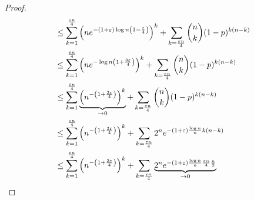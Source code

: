 \begin{proof}
\begin{align*}
		&\leq \sum_{k=1}^{\frac{\varepsilon n}{4}} \qty(ne^{-(1+\varepsilon) \log n \qty(1 - \frac{\varepsilon}{4})})^k + \sum_{k=\frac{\varepsilon n}{4}} \binom n k (1-p)^{k (n - k)} \\
		&\leq \sum_{k=1}^{\frac{\varepsilon n}{4}} \qty(ne^{-\log n\qty(1+\frac{3\varepsilon}{4})})^k + \sum_{k=\frac{\varepsilon n}{4}} \binom n k (1-p)^{k (n - k)} \\
		&\leq \sum_{k=1}^{\frac{\varepsilon n}{4}} \underbrace{\qty(n^{-\qty(1+\frac{3\varepsilon}{4})})^k}_{\to 0} + \sum_{k=\frac{\varepsilon n}{4}} \binom n k (1-p)^{k (n - k)} \\
		&\leq \sum_{k=1}^{\frac{\varepsilon n}{4}} \qty(n^{-\qty(1+\frac{3\varepsilon}{4})})^k + \sum_{k=\frac{\varepsilon n}{4}} 2^n e^{-(1 + \varepsilon) \frac{\log n}{n} k(n-k)} \\
		&\leq \sum_{k=1}^{\frac{\varepsilon n}{4}} \qty(n^{-\qty(1+\frac{3\varepsilon}{4})})^k + \sum_{k=\frac{\varepsilon n}{4}} \underbrace{2^n e^{-(1 + \varepsilon) \frac{\log n}{n} \frac{\varepsilon n}{4} \frac{n}{2}}}_{\to 0}
	\end{align*}
\end{proof}
